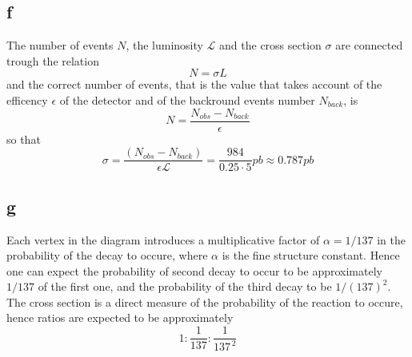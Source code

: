 \subsection*{f}
The number of events $N$, the luminosity $\mathcal{L}$ and the cross section $\sigma$ are connected trough the relation
\begin{equation*}
    N = \sigma L
\end{equation*}
and the correct number of events, that is the value that takes account of the efficency $\epsilon$ of the detector and of the backround events number $N_{back}$, is
\begin{equation*}
    N = \frac{N_{obs} - N_{back}}{\epsilon}
\end{equation*}
so that
\begin{equation*}
\sigma= \frac{(N_{obs}-N_{back})}{\epsilon \mathcal{L}} = \frac{984}{0.25 \cdot 5} pb \approx 0.787 pb
\end{equation*} 

\subsection*{g}
Each vertex in the diagram introduces a multiplicative factor of $\alpha = 1/137$ in the probability of the decay to occure, where $\alpha$ is the fine structure constant.
Hence one can expect the probability of second decay to occur to be approximately $1/137$ of the first one, and the probability of the third decay to be $1/(137)^2$. \\
The cross section is a direct measure of the probability of the reaction to occure, hence ratios are expected to be approximately
\begin{equation*}
    1 : \frac{1}{137} : \frac{1}{137^{\, 2}}
\end{equation*}